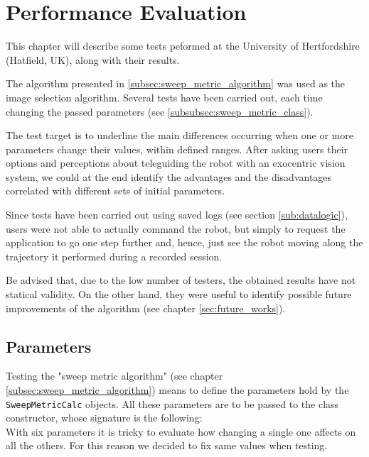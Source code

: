 \section{Performance Evaluation}
\label{sec:performance_evaluation}
%
This chapter will describe some tests peformed at the 
University of Hertfordshire (Hatfield, UK), along with 
their results. 
%

%
The algorithm presented in \ref{subsec:sweep_metric_algorithm}
was used as the image selection algorithm. Several tests 
have been carried out, each time changing the passed parameters
(see \ref{subsubsec:sweep_metric_class}).
%

%
The test target is to underline the main differences 
occurring when one or more parameters change their values, 
within defined ranges. After asking users their options 
and perceptions about teleguiding the robot with an 
exocentric vision system, we could at the end identify 
the advantages and the disadvantages correlated with 
different sets of initial parameters.
%

%
Since tests have been carried out using saved logs 
(see section \ref{sub:datalogic}), users were not 
able to actually command the robot, but simply 
to request the application to go one step
further and, hence, just see the robot moving along 
the trajectory it performed during a recorded 
session.
%

%
Be advised that, due to the low number of testers, 
the obtained results have not statical validity.
%
On the other hand, they were useful to identify 
possible future improvements of the algorithm 
(see chapter \ref{sec:future_works}).
%
\subsection{Parameters}
\label{subsec:parameters}

Testing the "sweep metric algorithm" (see chapter \ref{subsec:sweep_metric_algorithm}) means to define
the parameters hold by the \texttt{SweepMetricCalc} objects. All these parameters are 
to be passed to the class constructor, whose signature is the following:
\\
With six parameters it is tricky to evaluate how changing a single one affects on all the others. For this
reason we decided to fix same values when testing.
%


